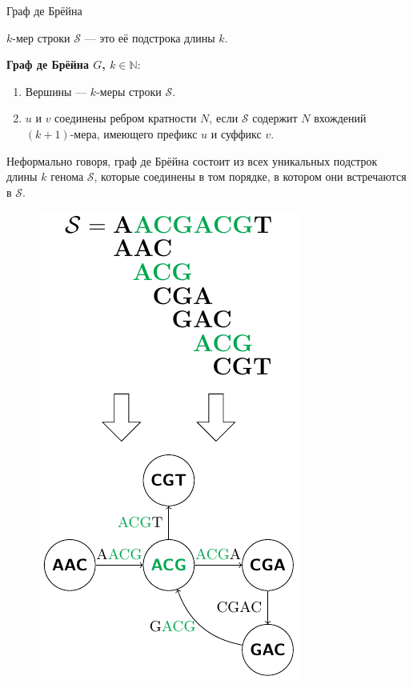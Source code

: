\documentclass[unicode, notheorems]{beamer}
\begin{document}
\begin{frame}[fragile]{Граф де Брёйна}
    \begin{minipage}{0.6\textwidth}
    	\begin{block}{}
    		$k$-мер строки $\mathcal{S}$ --- это её подстрока длины $k$.
    	\end{block}
        \textbf{Граф де Брёйна $G$, $k \in \mathbb{N}$}:
        \begin{enumerate}
            \item Вершины --- $k$-меры строки $\mathcal{S}$.
            \item $u$ и $v$ соединены ребром кратности $N$, если $\mathcal{S}$ содержит $N$ вхождений $(k+1)$-мера, имеющего префикс $u$ и суффикс $v$.
        \end{enumerate}
		
		\medskip
		Неформально говоря, граф де Брёйна состоит из всех уникальных подстрок длины $k$ генома $\mathcal{S}$, которые соединены в том порядке, в котором они встречаются в $\mathcal{S}$.
    \end{minipage}%
    \begin{minipage}{0.4\textwidth}
    	\begin{figure}
	        \flushright
    	    \includegraphics[width=0.9\linewidth]{fig/dBg_simple}

\end{figure}
\end{minipage}
\end{frame}
\end{document}
